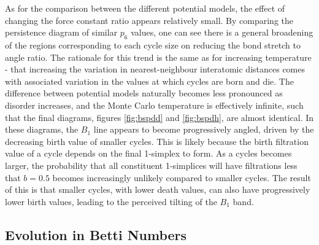 
As for the comparison between the different potential models, the effect of changing the force constant ratio appears relatively small.
By comparing the persistence diagram of similar $p_6$ values, one can see there is a general broadening of the regions corresponding to each cycle size on reducing the bond stretch to angle ratio.
The rationale for this trend is the same as for increasing temperature - that increasing the variation in nearest\--neighbour interatomic distances comes with associated variation in the values at which cycles are born and die.
The difference between potential models naturally becomes less pronounced as disorder increases, and the Monte Carlo temperature is effectively infinite, such that the final diagrams, figures \ref{fig:bspdd} and \ref{fig:bspdh}, are almost identical.
In these diagrams, the $B_1$ line appears to become progressively angled, driven by the decreasing birth value of smaller cycles.
This is likely because the birth filtration value of a cycle depends on the final 1\--simplex to form.
As a cycles becomes larger, the probability that all constituent 1\--simplices will have filtrations less that $b=0.5$ becomes increasingly unlikely compared to smaller cycles.
The result of this is that smaller cycles, with lower death values, can also have progressively lower birth values, leading to the perceived tilting of the $B_1$ band.

\subsection{Evolution in Betti Numbers}

